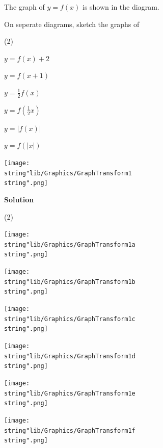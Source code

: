 \documentclass[11pt,a4paper]{book}
\begin{document}
\newpage

\begin{example}{}
The graph of $y=f\left(x\right)$ is shown in the diagram.

\begin{minipage}[t]{0.5\textwidth}

On seperate diagrams, sketch the graphs of

\begin{tasks}[label=(\alph*),label-width=3.5ex](2)

\task $y=f\left(x\right)+2$

\task  $y=f\left(x+1\right)$

\task  ${\displaystyle y=\frac{1}{2}f\left(x\right)}$

\task ${\displaystyle y=f\left(\frac{1}{2}x\right)}$

\task  $y=\left|f\left(x\right)\right|$

\task  $y=f\left(\left|x\right|\right)$

\end{tasks}

\end{minipage}
\begin{minipage}[t]{0.5\textwidth}
\begin{center}
\texttt{[image: \\string"lib/Graphics/GraphTransform1\\string".png]}
\par\end{center}

\end{minipage}

\textbf{Solution}

\begin{tasks}[label=(\alph*),label-width=3.5ex](2)

\task  \texttt{[image: \\string"lib/Graphics/GraphTransform1a\\string".png]}

\task  \texttt{[image: \\string"lib/Graphics/GraphTransform1b\\string".png]}

\task \texttt{[image: \\string"lib/Graphics/GraphTransform1c\\string".png]}

\task  \texttt{[image: \\string"lib/Graphics/GraphTransform1d\\string".png]}

\task \texttt{[image: \\string"lib/Graphics/GraphTransform1e\\string".png]}

\task  \texttt{[image: \\string"lib/Graphics/GraphTransform1f\\string".png]}

\end{tasks}

\end{example}
\end{document}
